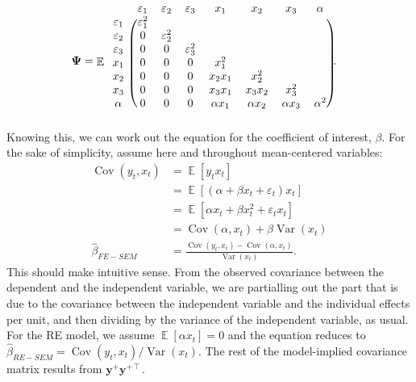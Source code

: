 \documentclass[
  12pt,
  a4paper]{article}
\DeclareMathOperator{\E}{\mathbb{E}}
\DeclareMathOperator{\Var}{\mathrm{Var}}
\DeclareMathOperator{\Cov}{\mathrm{Cov}}
\begin{document}
\begin{align}
\bm{\Psi} & = \E
\begin{blockarray}{cccccccc}
 & \varepsilon_{1} & \varepsilon_{2} & \varepsilon_{3} & x_{1} & x_{2} & x_{3} & \alpha \\
 \begin{block}{c(ccccccc)}
 \varepsilon_{1} & \varepsilon_{1}^{2} &                     &                     &              &              &              & \\
 \varepsilon_{2} & 0                   & \varepsilon_{2}^{2} &                     &              &              &              & \\
 \varepsilon_{3} & 0                   & 0                   & \varepsilon_{3}^{2} &              &              &              & \\
 x_{1}           & 0                   & 0                   & 0                   & x_{1}^{2}    &              &              & \\
 x_{2}           & 0                   & 0                   & 0                   & x_{2}x_{1}   & x_{2}^{2}    &              & \\
 x_{3}           & 0                   & 0                   & 0                   & x_{3}x_{1}   & x_{3}x_{2}   & x_{3}^{2}    & \\
 \alpha          & 0                   & 0                   & 0                   & \alpha x_{1} & \alpha x_{2} & \alpha x_{3} & \alpha^{2} \\
 \end{block}
\end{blockarray}.
\end{align} Knowing this, we can work out the equation for the
coefficient of interest, \(\beta\). For the sake of simplicity, assume
here and throughout mean-centered variables: \begin{align}
\Cov(y_{t},x_{t}) & = \E[y_{t}x_{t}] \\
 & = \E[(\alpha + \beta x_{t} + \varepsilon_{t})x_{t}] \\
 & = \E[\alpha x_{t} + \beta x_{t}^{2} + \varepsilon_{t}x_{t}] \\
 & = \Cov(\alpha, x_{t}) + \beta \Var(x_{t}) \\
\hat{\beta}_{FE-SEM} & = \frac{\Cov(y_{t},x_{t}) - \Cov(\alpha, x_{t})}{\Var(x_{t})}. 
\end{align} This should make intuitive sense. From the observed
covariance between the dependent and the independent variable, we are
partialling out the part that is due to the covariance between the
independent variable and the individual effects per unit, and then
dividing by the variance of the independent variable, as usual. For the
RE model, we assume \(\E[\alpha x_{t}] = 0\) and the equation reduces to
\(\hat{\beta}_{RE-SEM} = \Cov(y_{t},x_{t})/\Var(x_{t})\). The rest of
the model-implied covariance matrix results from
\(\bm{y}^{+}\bm{y}^{+ \intercal}\).
\end{document}
